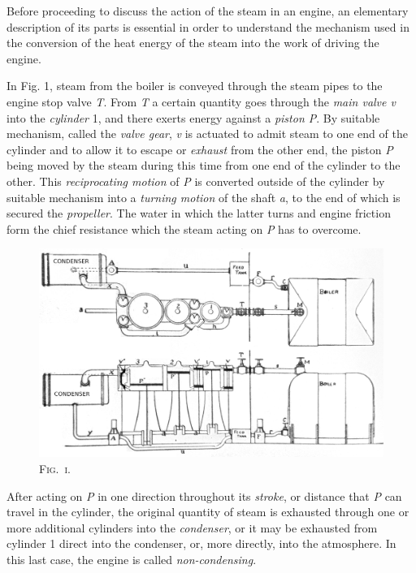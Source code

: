 \documentclass[11pt, a5paper]{book}
\begin{document}
Before proceeding to discuss the action of the steam in an engine, an
elementary description of its parts is essential in order to
understand the mechanism used in the conversion of the heat energy of
the steam into the work of driving the engine.\par

In Fig. 1, steam from the boiler is conveyed through the steam pipes
to the engine stop valve \textit{T}.  From \textit{T} a certain
quantity goes through the \textit{main valve v} into the
\textit{cylinder} 1, and there exerts energy against a \textit{piston
 P}.  By suitable mechanism, called the \textit{valve gear},
\textit{v} is actuated to admit steam to one end of the cylinder and
to allow it to escape or \textit{exhaust} from the other end, the
piston \textit{P} being moved by the steam during this time from one
end of the cylinder to the other.  This \textit{reciprocating motion}
of \textit{P} is converted outside of the cylinder by suitable
mechanism into a \textit{turning motion} of the shaft \textit{a}, to
the end of which is secured the \textit{propeller}.  The water in
which the latter turns and engine friction form the chief resistance
which the steam acting on \textit{P} has to overcome.\par

\begin{figure}[h]
  \centering
  \includegraphics[scale=0.5]{fig_1.jpg}
  \caption*{\textsc{Fig.\ i.}}
\end{figure}

After acting on \textit{P} in one direction throughout its
\textit{stroke}, or distance that \textit{P} can travel in the
cylinder, the original quantity of steam is exhausted through one or
more additional cylinders into the \textit{condenser}, or it may be
exhausted from cylinder 1 direct into the condenser, or, more
directly, into the atmosphere.  In this last case, the engine is
called \textit{non-condensing}.\par
\end{document}
